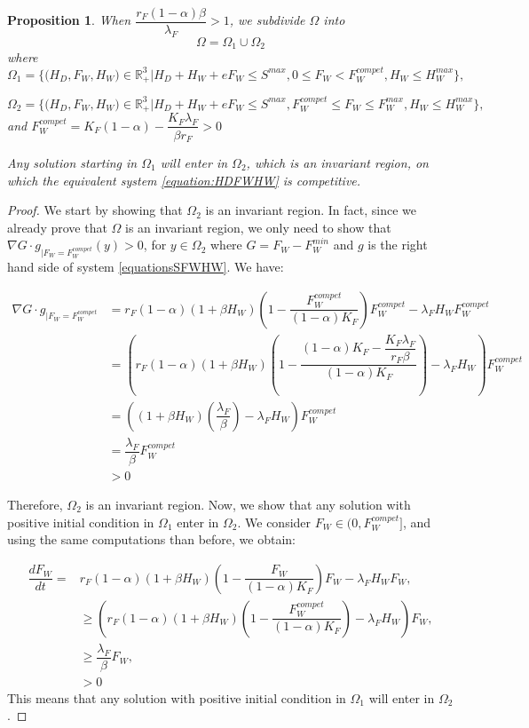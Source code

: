 \documentclass{article}
\newcommand{\lfw}{\lambda_{F}}
\newcommand{\lfw}{\lambda_{F}}
\newtheorem{prop}{Proposition}
\begin{document}
\begin{prop}
When $\dfrac{r_F(1-\alpha) \beta}{\lfw} > 1$, we subdivide $\Omega$ into
$$
\Omega = \Omega_1 \cup \Omega_2
$$
where
$$
\Omega_1 = \Big\{\Big(H_D, F_W, H_W \Big) \in \mathbb{R}_+^3  \Big|H_D + H_W + eF_W \leq S^{max}, 0 \leq F_W < F_W^{compet}, H_W \leq H_W^{max} \Big\},
$$

$$
\Omega_2 = \Big\{\Big(H_D, F_W, H_W \Big) \in \mathbb{R}_+^3  \Big|H_D + H_W + eF_W \leq S^{max}, F_W^{compet} \leq F_W \leq F_W^{max}, H_W \leq H_W^{max} \Big\},
$$
and
$F_W^{compet} = K_F(1-\alpha) - \dfrac{K_F \lfw}{\beta r_F} > 0
$

Any solution starting in $\Omega_1$ will enter in $\Omega_2$, which is an invariant region, on which the equivalent system \eqref{equation:HDFWHW} is competitive.
\end{prop}

\begin{proof}
We start by showing that $\Omega_2$ is an invariant region. In fact, since we already prove that $\Omega$ is an invariant region, we only need to show that 
$\nabla G \cdot g _{|F_W = F_W^{compet}}(y) > 0$, for $y \in \Omega_2$ where $G = F_W - F_W^{min}$ and $g$ is the right hand side of system \eqref{equationsSFWHW}. We have:

\begin{align*}
\nabla G \cdot g _{|F_W = F_W^{compet}} &= r_F(1-\alpha)(1+\beta H_W) \left(1 - \dfrac{F_W^{compet}}{(1-\alpha) K_F} \right)F_W^{compet} - \lfw H_W F^{compet}_W \\
&= \left(r_F(1-\alpha)(1+\beta H_W) \left(1 - \dfrac{(1-\alpha) K_F - \dfrac{K_F \lfw}{r_F \beta}}{(1-\alpha) K_F}\right) - \lfw H_W \right) F^{compet}_W \\
&= \left((1+\beta H_W) \left( \dfrac{\lfw}{\beta}\right) - \lfw H_W \right) F^{compet}_W \\
&= \dfrac{\lfw}{\beta} F_W^{compet} \\
&> 0
\end{align*}

Therefore, $\Omega_2$ is an invariant region. Now, we show that any solution with positive initial condition in $ \Omega_1$ enter in $\Omega_2$. We consider $F_W \in (0, F_W^{compet}]$, and using the same computations than before, we obtain:

\begin{align*}
\dfrac{dF_W}{dt} = &r_F(1-\alpha)(1+\beta H_W) \left(1 - \dfrac{F_W}{(1-\alpha) K_F}\right)F_W - \lfw H_W  F_W, \\
& \geq \left(r_F(1-\alpha)(1+\beta H_W) \left(1 - \dfrac{F_W^{compet}}{(1-\alpha) K_F}\right) - \lfw H_W  \right) F_W, \\
& \geq \dfrac{\lfw}{\beta} F_W,\\
&> 0
\end{align*}
This means that any solution with positive initial condition in $\Omega_1$ will enter in $\Omega_2$.
\end{proof}
\end{document}
